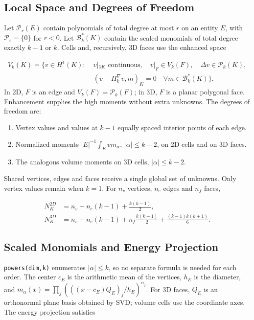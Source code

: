 \documentclass[11pt,oneside]{book}
\theoremstyle{definition}
\theoremstyle{plain}
\newcommand{\code}[1]{\texttt{#1}}
\begin{document}
\subsection{Local Space and Degrees of Freedom}
Let $\mathcal P_r(E)$ contain polynomials of total degree at most $r$ on an entity $E$,
with $\mathcal P_r=\{0\}$ for $r<0$. Let $\mathcal B_k^*(K)$ contain the scaled
monomials of total degree exactly $k-1$ or $k$. Cells and, recursively, 3D faces use
the enhanced space

\begin{equation}
\begin{split}
V_k(K)=\{v\in H^1(K):\;&v|_{\partial K}\text{ continuous},\quad
v|_F\in V_k(F),\quad \Delta v\in\mathcal P_k(K),\\
&(v-\Pi_k^\nabla v,m)_K=0\quad\forall m\in\mathcal B_k^*(K)\}.
\end{split}
\label{eq:vem-space}
\end{equation}
In 2D, $F$ is an edge and $V_k(F)=\mathcal P_k(F)$; in 3D, $F$ is a planar
polygonal face. Enhancement supplies the high moments without extra unknowns.
The degrees of freedom are:
\begin{enumerate}[itemsep=0.2em]
\item Vertex values and values at $k-1$ equally spaced interior points of each edge.
\item Normalized moments $|E|^{-1}\int_E v m_\alpha$, $|\alpha|\le k-2$,
on 2D cells and on 3D faces.
\item The analogous volume moments on 3D cells, $|\alpha|\le k-2$.
\end{enumerate}
Shared vertices, edges and faces receive a single global set of unknowns.
Only vertex values remain when $k=1$. For $n_v$ vertices, $n_e$ edges and $n_f$ faces,

\begin{align*}
N_K^{2D}&=n_v+n_e(k-1)+\frac{k(k-1)}2,\\
N_K^{3D}&=n_v+n_e(k-1)+n_f\frac{k(k-1)}2+
\frac{(k-1)k(k+1)}6.
\end{align*}

\subsection{Scaled Monomials and Energy Projection}
\code{powers(dim,\allowbreak k)} enumerates $|\alpha|\le k$, so no separate formula is needed
for each order. The center $c_E$ is the arithmetic mean of the vertices, $h_E$ is the
diameter, and $m_\alpha(x)=\prod_j(((x-c_E)Q_E)_j/h_E)^{\alpha_j}$.
For 3D faces, $Q_E$ is an orthonormal plane basis obtained by SVD; volume cells use
the coordinate axes. The energy projection satisfies
\end{document}
